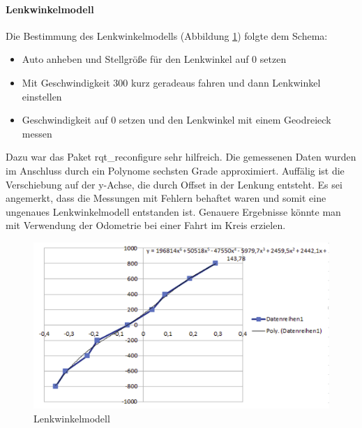 \paragraph{Lenkwinkelmodell}
Die Bestimmung des Lenkwinkelmodells (Abbildung \ref{fig:steering_profile}) folgte dem Schema:
\begin{itemize}
	\item Auto anheben und Stellgr\"o\ss{}e f\"ur den Lenkwinkel auf 0 setzen
	\item Mit Geschwindigkeit 300 kurz geradeaus fahren und dann Lenkwinkel einstellen
	\item Geschwindigkeit auf 0 setzen und den Lenkwinkel mit einem Geodreieck messen
\end{itemize}
Dazu war das Paket rqt\_reconfigure sehr hilfreich. Die gemessenen Daten wurden im Anschluss durch ein Polynome sechsten Grade approximiert. Auff\"alig ist die Verschiebung auf der y-Achse, die durch Offset in der Lenkung entsteht. Es sei angemerkt, dass die Messungen mit Fehlern behaftet waren und somit eine ungenaues Lenkwinkelmodell entstanden ist. Genauere Ergebnisse k\"onnte man mit Verwendung der Odometrie bei einer Fahrt im Kreis erzielen.
\begin{figure}[h] %
	\centering
	\includegraphics[width=0.7\linewidth]{pics/steering_profile}
	\caption{Lenkwinkelmodell}
	\label{fig:steering_profile}
\end{figure}